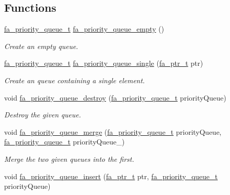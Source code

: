 \subsection*{Functions}
\begin{DoxyCompactItemize}
\item 
\hyperlink{group___fa_priority_queue_ga4363f15ce2b05e7c4af410cd6509ef5a}{fa\-\_\-priority\-\_\-queue\-\_\-t} \hyperlink{group___fa_priority_queue_gaa1699e0b582ae2989a2d56e494838e30}{fa\-\_\-priority\-\_\-queue\-\_\-empty} ()
\begin{DoxyCompactList}\small\item\em Create an empty queue. \end{DoxyCompactList}\item 
\hyperlink{group___fa_priority_queue_ga4363f15ce2b05e7c4af410cd6509ef5a}{fa\-\_\-priority\-\_\-queue\-\_\-t} \hyperlink{group___fa_priority_queue_gaaabe71c5b718985a2a9b2859fc7f6ea8}{fa\-\_\-priority\-\_\-queue\-\_\-single} (\hyperlink{group___fa_ga915ddeae99ad7568b273d2b876425197}{fa\-\_\-ptr\-\_\-t} ptr)
\begin{DoxyCompactList}\small\item\em Create an queue containing a single element. \end{DoxyCompactList}\item 
void \hyperlink{group___fa_priority_queue_gacbdd365a4a621b0458929645f27a016d}{fa\-\_\-priority\-\_\-queue\-\_\-destroy} (\hyperlink{group___fa_priority_queue_ga4363f15ce2b05e7c4af410cd6509ef5a}{fa\-\_\-priority\-\_\-queue\-\_\-t} priority\-Queue)
\begin{DoxyCompactList}\small\item\em Destroy the given queue. \end{DoxyCompactList}\item 
void \hyperlink{group___fa_priority_queue_ga5efe0e7da7de5cdbd2a88103922e3b69}{fa\-\_\-priority\-\_\-queue\-\_\-merge} (\hyperlink{group___fa_priority_queue_ga4363f15ce2b05e7c4af410cd6509ef5a}{fa\-\_\-priority\-\_\-queue\-\_\-t} priority\-Queue, \hyperlink{group___fa_priority_queue_ga4363f15ce2b05e7c4af410cd6509ef5a}{fa\-\_\-priority\-\_\-queue\-\_\-t} priority\-Queue\-\_\-)
\begin{DoxyCompactList}\small\item\em Merge the two given queues into the first. \end{DoxyCompactList}\item 
void \hyperlink{group___fa_priority_queue_ga579f5579ab78eb82223b769f4a56933f}{fa\-\_\-priority\-\_\-queue\-\_\-insert} (\hyperlink{group___fa_ga915ddeae99ad7568b273d2b876425197}{fa\-\_\-ptr\-\_\-t} ptr, \hyperlink{group___fa_priority_queue_ga4363f15ce2b05e7c4af410cd6509ef5a}{fa\-\_\-priority\-\_\-queue\-\_\-t} priority\-Queue)

\end{DoxyCompactItemize}
